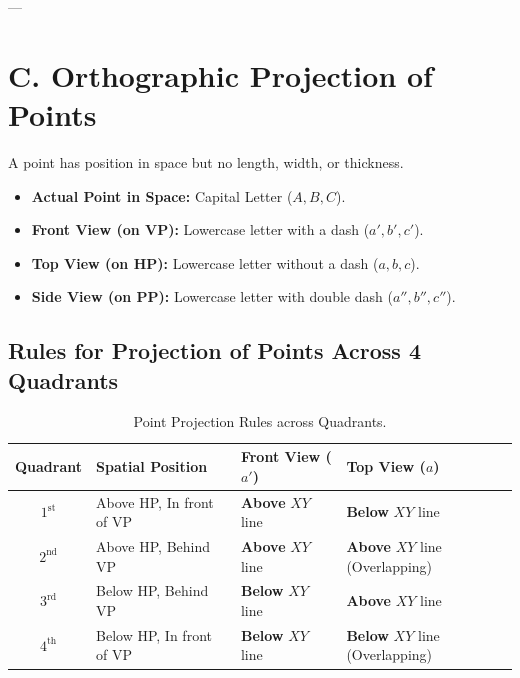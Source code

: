 ---

\section{C. Orthographic Projection of Points}

A point has position in space but no length, width, or thickness.

\begin{importantrule}
\begin{itemize}
    \item \textbf{Actual Point in Space:} Capital Letter ($A, B, C$).
    \item \textbf{Front View (on VP):} Lowercase letter with a dash ($a', b', c'$).
    \item \textbf{Top View (on HP):} Lowercase letter without a dash ($a, b, c$).
    \item \textbf{Side View (on PP):} Lowercase letter with double dash ($a'', b'', c''$).
\end{itemize}
\end{importantrule}

\subsection{Rules for Projection of Points Across 4 Quadrants}

\begin{table}[htbp]
\centering
\small
\begin{tabularx}{\textwidth}{c l l l}
\toprule
\textbf{Quadrant} & \textbf{Spatial Position} & \textbf{Front View ($a'$)} & \textbf{Top View ($a$)} \\
\midrule
$1^{\text{st}}$ & Above HP, In front of VP & \textbf{Above} $XY$ line & \textbf{Below} $XY$ line \\
$2^{\text{nd}}$ & Above HP, Behind VP & \textbf{Above} $XY$ line & \textbf{Above} $XY$ line (Overlapping) \\
$3^{\text{rd}}$ & Below HP, Behind VP & \textbf{Below} $XY$ line & \textbf{Above} $XY$ line \\
$4^{\text{th}}$ & Below HP, In front of VP & \textbf{Below} $XY$ line & \textbf{Below} $XY$ line (Overlapping) \\
\bottomrule
\end{tabularx}
\caption{Point Projection Rules across Quadrants.}
\label{tab:point-rules}
\end{table}

